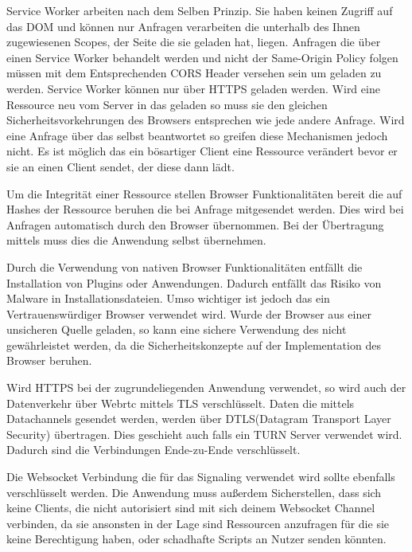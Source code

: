 Service Worker arbeiten nach dem Selben Prinzip. Sie haben keinen Zugriff auf das DOM und können nur Anfragen verarbeiten die unterhalb des Ihnen zugewiesenen Scopes, der Seite die sie geladen hat, liegen.\cite{moz_sw} Anfragen die über einen Service Worker behandelt werden und nicht der Same-Origin Policy folgen müssen mit dem Entsprechenden CORS Header versehen sein um geladen zu werden. Service Worker können nur über HTTPS geladen werden. Wird eine Ressource neu vom Server in das \pTp \cdn geladen so muss sie den gleichen Sicherheitsvorkehrungen des Browsers entsprechen wie jede andere Anfrage. Wird eine Anfrage über das \pTp \cdn selbst beantwortet so greifen diese Mechanismen jedoch nicht. Es ist möglich das ein bösartiger Client eine Ressource verändert bevor er sie an einen Client sendet, der diese dann lädt. 

Um die Integrität einer Ressource stellen Browser Funktionalitäten bereit die auf Hashes der Ressource beruhen die bei Anfrage mitgesendet werden.\cite{sub_res_integrity} Dies wird bei Anfragen automatisch durch den Browser übernommen. Bei der Übertragung mittels \webrtc muss dies die Anwendung selbst übernehmen.  

Durch die Verwendung von nativen Browser Funktionalitäten entfällt die Installation von Plugins oder Anwendungen. Dadurch entfällt das Risiko von Malware in Installationsdateien. Umso wichtiger ist jedoch das ein Vertrauenswürdiger Browser verwendet wird. Wurde der Browser aus einer unsicheren Quelle geladen, so kann eine sichere Verwendung des \cdns nicht gewährleistet werden, da die Sicherheitskonzepte auf der Implementation des Browser beruhen.\cite{webrtc-security}

Wird HTTPS bei der zugrundeliegenden Anwendung verwendet, so wird auch der Datenverkehr über Webrtc mittels TLS verschlüsselt.\cite{rtcweb-security} Daten die mittels \webrtc Datachannels gesendet werden, werden über DTLS(Datagram Transport Layer Security) übertragen. Dies geschieht auch falls ein TURN Server verwendet wird. Dadurch sind die Verbindungen Ende-zu-Ende verschlüsselt.

Die Websocket Verbindung die für das Signaling verwendet wird sollte ebenfalls verschlüsselt werden. Die Anwendung muss außerdem Sicherstellen, dass sich keine Clients, die nicht autorisiert sind mit sich deinem Websocket Channel verbinden, da sie ansonsten in der Lage sind Ressourcen anzufragen für die sie keine Berechtigung haben, oder schadhafte Scripts an Nutzer senden könnten.

